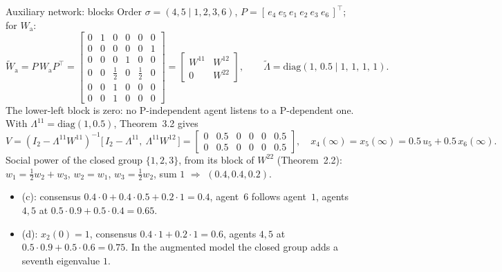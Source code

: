 \begin{frame}[label=bk-aux]{Auxiliary network: blocks}
  \scriptsize
  Order $\sigma = (4, 5 \mid 1, 2, 3, 6)$, $P = [\, e_4\ e_5\ e_1\ e_2\ e_3\ e_6 \,]^\top$; for
  $W_{\mathrm{a}}$:
  \[
    \tilde W_{\mathrm{a}} = P\, W_{\mathrm{a}} P^\top =
    \left[\begin{array}{cc|cccc}
      0 & 1 & 0 & 0 & 0 & 0\\
      0 & 0 & 0 & 0 & 0 & 1\\ \hline
      0 & 0 & 0 & 1 & 0 & 0\\
      0 & 0 & \tfrac12 & 0 & \tfrac12 & 0\\
      0 & 0 & 1 & 0 & 0 & 0\\
      0 & 0 & 1 & 0 & 0 & 0
    \end{array}\right]
    = \begin{bmatrix} W^{11} & W^{12} \\ 0 & W^{22} \end{bmatrix},
    \qquad
    \tilde\Lambda = \mathrm{diag}(1,\, 0.5 \mid 1,\, 1,\, 1,\, 1).
  \]
  The lower-left block is zero: no P-independent agent listens to a P-dependent one. With
  $\Lambda^{11} = \mathrm{diag}(1, 0.5)$, Theorem~3.2 gives
  \[
    V = (I_2 - \Lambda^{11} W^{11})^{-1}\big[\, I_2 - \Lambda^{11},\ \Lambda^{11} W^{12} \,\big]
      = \left[\begin{array}{cc|cccc}
          0 & 0.5 & 0 & 0 & 0 & 0.5\\ 0 & 0.5 & 0 & 0 & 0 & 0.5
        \end{array}\right],
    \quad x_4(\infty) = x_5(\infty) = 0.5\, u_5 + 0.5\, x_6(\infty).
  \]
  Social power of the closed group $\{1, 2, 3\}$, from its block of $W^{22}$
  (Theorem~2.2): $w_1 = \tfrac12 w_2 + w_3$, $w_2 = w_1$, $w_3 = \tfrac12 w_2$, sum $1$
  $\Rightarrow$ $(0.4, 0.4, 0.2)$.
  \begin{itemize}
    \item (c): consensus $0.4 \cdot 0 + 0.4 \cdot 0.5 + 0.2 \cdot 1 = 0.4$, agent~$6$ follows
          agent~$1$, agents $4, 5$ at $0.5 \cdot 0.9 + 0.5 \cdot 0.4 = 0.65$.
    \item (d): $x_2(0) = 1$, consensus $0.4 \cdot 1 + 0.2 \cdot 1 = 0.6$, agents $4, 5$ at
          $0.5 \cdot 0.9 + 0.5 \cdot 0.6 = 0.75$. In the augmented model the closed group
          adds a seventh eigenvalue $1$.
  \end{itemize}
\end{frame}

